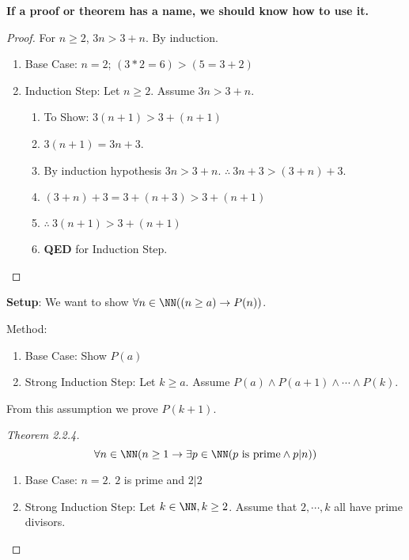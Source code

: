 \textbf{If a proof or theorem has a name, we should know how to use it.}
\begin{proof}
For $n \ge 2$, $3n > 3+n$. By induction.
\begin{enumerate}
	\item Base Case: $n=2$; $\left( 3*2 = 6 \right) > \left( 5 = 3 + 2 \right)$ \checkmark
	\item Induction Step: Let $n \ge 2$. Assume $3n > 3 +n$.
		\begin{enumerate}
			\item To Show: $3(n+1)>3+(n+1)$
			\item $3(n+1)=3n+3$.
			\item By induction hypothesis $3n > 3+n$. $\therefore\ 3n+3>(3+n)+3$.
			\item $(3+n)+3=3+(n+3)>3+(n+1)$
			\item $\therefore\ 3(n+1) > 3+(n+1)$
			\item \textbf{QED} for Induction Step.
		\end{enumerate}
\end{enumerate}
\end{proof}
\textbf{Setup}: We want to show $\forall n \in \NN ( (n \ge a) \to P(n))$.
\begin{definition}Method:
\begin{enumerate}
\item Base Case: Show $P(a)$
\item Strong Induction Step: Let $k\ge a$. Assume $P(a) \wedge P(a+1)\wedge \cdots \wedge P(k)$.
\end{enumerate}
From this assumption we prove $P(k+1)$.
\end{definition}
\begin{proof}[Theorem 2.2.4]
\[\forall n \in \NN ( n \ge 1 \to \exists p \in \NN ( p \text{ is prime} \wedge p|n)) \]
\begin{enumerate}
\item Base Case: $n = 2$. $2$ is prime and $2|2$ \checkmark
\item Strong Induction Step: Let $k \in \NN, k \ge 2$. Assume that $2,\cdots,k$ all have prime divisors.
\end{enumerate}
\end{proof}


